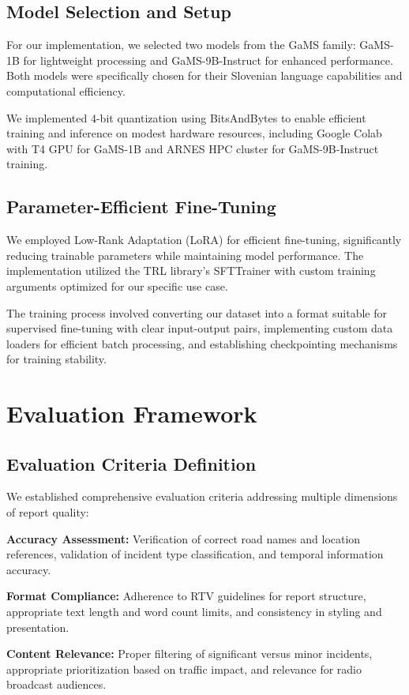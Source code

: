 \documentclass[fleqn,moreauthors,10pt]{ds_report}
\begin{document}
\subsection*{Model Selection and Setup}
For our implementation, we selected two models from the GaMS family: GaMS-1B for lightweight processing and GaMS-9B-Instruct for enhanced performance. Both models were specifically chosen for their Slovenian language capabilities and computational efficiency.

We implemented 4-bit quantization using BitsAndBytes to enable efficient training and inference on modest hardware resources, including Google Colab with T4 GPU for GaMS-1B and ARNES HPC cluster for GaMS-9B-Instruct training.

\subsection*{Parameter-Efficient Fine-Tuning}
We employed Low-Rank Adaptation (LoRA) for efficient fine-tuning, significantly reducing trainable parameters while maintaining model performance. The implementation utilized the TRL library's SFTTrainer with custom training arguments optimized for our specific use case.

The training process involved converting our dataset into a format suitable for supervised fine-tuning with clear input-output pairs, implementing custom data loaders for efficient batch processing, and establishing checkpointing mechanisms for training stability.


\section*{Evaluation Framework}

\subsection*{Evaluation Criteria Definition}
We established comprehensive evaluation criteria addressing multiple dimensions of report quality:

\textbf{Accuracy Assessment:} Verification of correct road names and location references, validation of incident type classification, and temporal information accuracy.

\textbf{Format Compliance:} Adherence to RTV guidelines for report structure, appropriate text length and word count limits, and consistency in styling and presentation.

\textbf{Content Relevance:} Proper filtering of significant versus minor incidents, appropriate prioritization based on traffic impact, and relevance for radio broadcast audiences.
\end{document}
